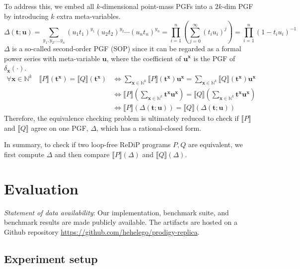 \documentclass[a4paper]{article}
\renewcommand{\S}[1]{ \llbracket #1 \rrbracket }
\begin{document}
\begin{enumerate}
	      To address this, we embed all \(k\)-dimensional point-mass PGFs into a \(2k\)-dim PGF by introducing \(k\) extra meta-variables.
	      \[
		      \Delta(\mathbf{t};\mathbf{u})
		      = \sum_{y_1,y_2,\ldots y_n} (u_1 t_1)^{y_1}(u_2 t_2)^{y_2}\cdots (u_n t_n)^{y_n}
		      = \prod_{i=1}^n \left( \sum_{j=0}^\infty (t_i u_i)^j \right)
		      = \prod_{i=1}^n (1-t_i u_i)^{-1}
	      \]
	      \(\Delta\) is a so-called second-order PGF (SOP) since it can be regarded as a formal power series with meta-variable \(\mathbf{u}\),
	      where the coefficient of \(\mathbf{u}^{\mathbf{x}}\) is the PGF of \(\delta_{\mathbf{x}}(\cdot)\).
	      \begin{align*}
		      \forall \mathbf{x} \in \mathbb{N}^k \quad \S{P}(\mathbf{t}^{\mathbf{x}}) = \S{Q}(\mathbf{t}^{\mathbf{x}})
		       & \iff
		      \sum_{\mathbf{x}\in\mathbb{N}^k} \S{P}(\mathbf{t}^{\mathbf{x}}) \mathbf{u}^\mathbf{x}
		      = \sum_{\mathbf{x}\in\mathbb{N}^k} \S{Q}(\mathbf{t}^{\mathbf{x}}) \mathbf{u}^\mathbf{x}              \\
		       & \iff
		      \S{P}\left( \sum_{\mathbf{x}\in\mathbb{N}^k} \mathbf{t}^{\mathbf{x}} \mathbf{u}^\mathbf{x} \right)
		      = \S{Q}\left( \sum_{\mathbf{x}\in\mathbb{N}^k} \mathbf{t}^{\mathbf{x}} \mathbf{u}^\mathbf{x} \right) \\
		       & \iff \S{P}(\Delta(\mathbf{t};\mathbf{u}))
		      = \S{Q}(\Delta(\mathbf{t};\mathbf{u}))
	      \end{align*}
	      Therefore, the equivalence checking problem is ultimately reduced to check if \(\S{P}\) and \(\S{Q}\) agree on one PGF, \(\Delta\), which has a rational-closed form.
\end{enumerate}

In summary, to check if two loop-free ReDiP programs \(P,Q\) are equivalent, we first compute \(\Delta\) and then compare \(\S{P}(\Delta)\) and \(\S{Q}(\Delta)\).

\section{Evaluation}

\emph{Statement of data availability}: Our implementation, benchmark suite, and benchmark results are made publicly available.
The artifacts are hosted on a Github repository \href{https://github.com/hehelego/prodigy-replica}{https://github.com/hehelego/prodigy-replica}.

\subsection{Experiment setup}
\end{document}
